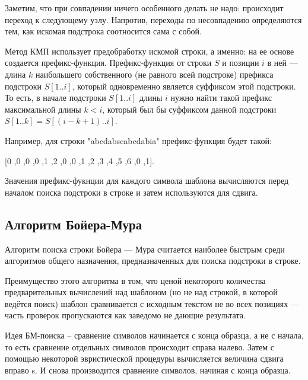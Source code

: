 \documentclass[a4paper,14pt]{report}
\begin{document}
Заметим,  что  при  совпадении  ничего  особенного  делать  не  надо:  происходит  переход  к  следующему  узлу. Напротив,  переходы  по  несовпадению  определяются  тем,  как  искомая подстрока соотносится  сама  с  собой.

Метод КМП использует предобработку искомой строки, а именно: на ее основе создается префикс-функция.
Префикс-функция от строки $S$ и позиции $i$ в ней — длина $k$  наибольшего собственного (не равного всей подстроке) префикса подстроки $S[1.. i]$, который одновременно является суффиксом этой подстроки.
То есть, в начале подстроки $S[1.. i]$ длины $i$ нужно найти такой префикс максимальной длины $k < i$, который был бы суффиксом данной подстроки $S[1..k]=S[(i-k+1)..i]$.

Например, для строки "abcdabscabcdabia" префикс-функция будет такой:

[0 ,0 ,0 ,0 ,1 ,2 ,0 ,0 ,1 ,2 ,3 ,4 ,5 ,6 ,0 ,1].

Значения префикс-фукнции для каждого символа шаблона вычисляются перед началом поиска подстроки в строке и затем используются для сдвига.


\subsection*{Алгоритм Бойера-Мура}

Алгоритм поиска строки Бойера — Мура считается наиболее быстрым среди алгоритмов общего назначения, предназначенных для поиска подстроки в строке.

Преимущество этого алгоритма в том, что ценой некоторого количества предварительных вычислений над шаблоном (но не над строкой, в которой ведётся поиск) шаблон сравнивается с исходным текстом не во всех позициях — часть проверок пропускаются как заведомо не дающие результата.

Идея БМ-поиска – сравнение символов начинается с конца образца, а не с начала, то есть сравнение отдельных символов происходит справа налево. Затем с помощью некоторой эвристической процедуры вычисляется величина сдвига вправо s. И снова производится сравнение символов, начиная с конца образца.
\end{document}
